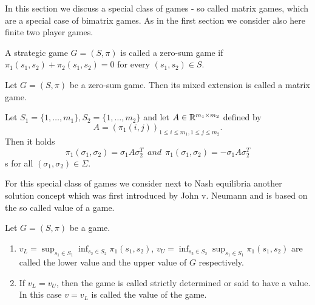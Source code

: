 In this section we discuss a special class of games - so called matrix games, which are a special case of bimatrix games. As in the first section we 
consider also here finite two player games.

\begin{definition}
    A strategic game $G = (S, \pi)$ is called a zero-sum game if $\pi_{1}(s_{1}, s_{2}) + \pi_{2}(s_{1}, s_{2}) = 0$ for every $(s_{1}, s_{2})\in S$.
\end{definition}

\begin{definition}
    Let $G = (S, \pi)$ be a zero-sum game. Then its mixed extension is called a matrix game.
\end{definition}

\begin{remark}
    Let $S_{1} = \{1, \ldots, m_{1}\}, S_{2} = \{1, \ldots, m_{2}\}$ and let $A\in\mathbb{R}^{m_{1}\times m_{2}}$ defined by
    \begin{equation*}
        A = (\pi_{1}(i, j))_{1\leq i\leq m_{1}, 1\leq j\leq m_{2}}.
    \end{equation*}
    Then it holds
    \begin{equation*}
        \pi_{1}(\sigma_{1}, \sigma_{2}) = \sigma_{1}A\sigma_{2}^{T} ~~ and ~~ \pi_{1}(\sigma_{1}, \sigma_{2}) = -\sigma_{1}A\sigma_{2}^{T}
    \end{equation*}s
    for all $(\sigma_{1}, \sigma_{2})\in\Sigma$.
\end{remark}

For this special class of games we consider next to Nash equilibria another solution concept which was first introduced by John v. Neumann and is based
on the so called value of a game.

\begin{definition}
    Let $G = (S, \pi)$ be a game.
    \begin{enumerate}
        \item $v_{L} = \sup_{s_{1}\in S_{1}}\inf_{s_{2}\in S_{2}}\pi_{1}(s_{1}, s_{2})$, $v_{U} = \inf_{s_{2}\in S_{2}}\sup_{s_{1}\in S_{1}}\pi_{1}(s_{1}, s_{2})$
            are called the lower value and the upper value of $G$ respectively.
        \item If $v_{L} = v_{U}$, then the game is called strictly determined or said to have a value. In this case $v = v_{L}$ is called the value of the game.
    \end{enumerate}
\end{definition}

